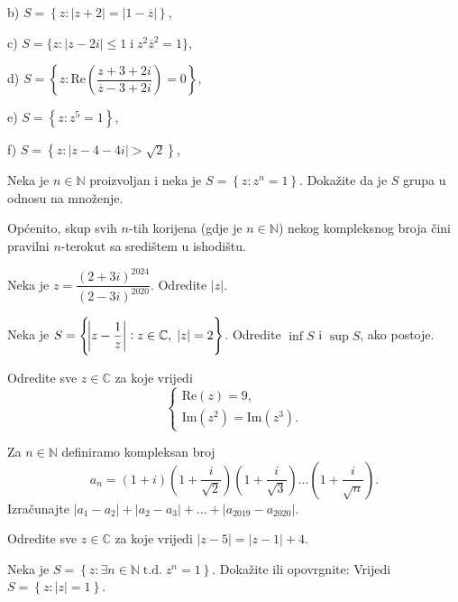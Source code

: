 \begin{exercise}
\begin{exercise}
\begin{AutoMultiColItemize}
\item[b)] $S=\left\{z : |z+2|=|1-\overline{z}|\right\}$,
\item[c)] $S=\{z : |z-2i|\leq 1 \; \mathrm{i} \; z^2\overline{z}^2=1\}$,
\item[d)] $S=\left\{z : \mathrm{Re}\left(\dfrac{z+3+2i}{\overline{z}-3+2i}\right)=0\right\}$,
\item[e)] $S=\left\{z : z^5=1\right\}$,
\item[f)] $S=\left\{z : |z-4-4i|>\sqrt{2}\right\}$,
\end{AutoMultiColItemize}
\end{exercise}
\begin{exercise}
Neka je $n\in \mathbb{N}$ proizvoljan i neka je $S=\left\{z : z^n=1 \right\}$. Dokažite da je $S$ grupa u odnosu na množenje.
\end{exercise}
Općenito, skup svih $n$-tih korijena (gdje je $n\in \mathbb{N}$) nekog kompleksnog broja čini pravilni $n$-terokut sa središtem u ishodištu.
\begin{exercise}
Neka je $z=\dfrac{(2+3i)^{2024}}{(2-3i)^{2020}}$. Odredite $|z|$.
\end{exercise}
\begin{exercise}
Neka je $S=\left\{\abs{z-\dfrac{1}{z}} : z\in \mathbb{C},\; |z|=2\right\}$. Odredite $\inf{S}$ i $\sup{S}$, ako postoje.
\end{exercise}
\begin{exercise}
Odredite sve $z\in \mathbb{C}$ za koje vrijedi
$$\begin{cases}
\mathrm{Re}(z)=9, \\
\mathrm{Im}(z^2)=\mathrm{Im}(z^3).
   \end{cases}$$
\end{exercise}
\begin{exercise}
Za $n\in \mathbb{N}$ definiramo kompleksan broj
$$a_n=(1+i)\left(1+\dfrac{i}{\sqrt{2}}\right)\left(1+\dfrac{i}{\sqrt{3}}\right)\dots \left(1+\dfrac{i}{\sqrt{n}}\right).$$
Izračunajte $|a_1-a_2|+|a_2-a_3|+\dots+|a_{2019}-a_{2020}|$.
\end{exercise}
\begin{exercise}
Odredite sve $z\in \mathbb{C}$ za koje vrijedi $|z-5|=|z-1|+4$.
\end{exercise}
\begin{exercise}
Neka je $S=\left\{z : \exists{n}\in \mathbb{N}\;\mathrm{t. d.}\; z^n=1 \right\}$. Dokažite ili opovrgnite: Vrijedi $S=\left\{z : |z|=1 \right\}$.
\end{exercise}
\begin{exercise}

\end{exercise}
\end{exercise}
